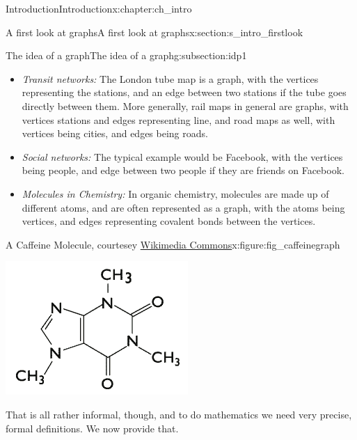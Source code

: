\documentclass[oneside,10pt,]{book}
\numberwithin{equation}{section}
\begin{document}
\begin{chapterptx}{Introduction}{}{Introduction}{}{}{x:chapter:ch_intro}
\begin{sectionptx}{A first look at graphs}{}{A first look at graphs}{}{}{x:section:s_intro_firstlook}
\begin{subsectionptx}{The idea of a graph}{}{The idea of a graph}{}{}{g:subsection:idp1}
\begin{itemize}[label=\textbullet]
\item{}\emph{Transit networks:} The London tube map is a graph, with the vertices representing the stations, and an edge between two stations if the tube goes directly between them.  More generally, rail maps in general are graphs, with vertices stations and edges representing line, and road maps as well, with vertices being cities, and edges being roads.%
\item{}\emph{Social networks:} The typical example would be Facebook, with the vertices being people, and edge between two people if they are friends on Facebook.%
\item{}\emph{Molecules in Chemistry:} In organic chemistry, molecules are made up of different atoms, and are often represented as a graph, with the atoms being vertices, and edges representing covalent bonds between the vertices.%
\end{itemize}
%
\begin{figureptx}{A Caffeine Molecule, courtesey \href{https://commons.wikimedia.org/wiki/File:Caffeine_molecule.png}{Wikimedia Commons}}{x:figure:fig_caffeinegraph}{}%
\begin{image}{0.05}{0.9}{0.05}%
\includegraphics[width=\linewidth]{images/Caffeine_molecule.png}
\end{image}%
\tcblower
\end{figureptx}%
That is all rather informal, though, and to do mathematics we need very precise, formal definitions.  We now provide that.%
\end{subsectionptx}
%
%
\typeout{************************************************}

\end{sectionptx}
\end{chapterptx}
\end{document}
